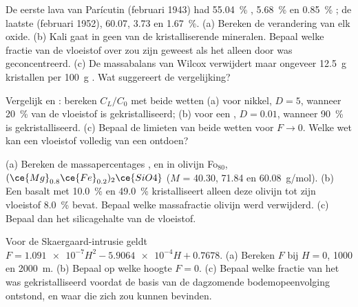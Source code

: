 \begin{exercise}[$\star$]\label{exo:b2:magmatic-differentiation:4}
De eerste lava van Parícutin (februari 1943) had \qty{55.04}{\percent} ,
\qty{5.68}{\percent}  en \qty{0.85}{\percent} ; de laatste (februari
1952), 60.07, 3.73 en \qty{1.67}{\percent}. (a) Bereken de verandering van elk oxide.
(b) Kali gaat in geen van de kristalliserende mineralen. Bepaal welke fractie van de vloeistof
over zou zijn geweest als het alleen door  was geconcentreerd.
(c) De massabalans van Wilcox verwijdert maar ongeveer \qty{12.5}{g} kristallen per
\qty{100}{g} . Wat suggereert de vergelijking?
\end{exercise}

\begin{exercise}[$\star\star$]\label{exo:b2:magmatic-differentiation:5}
Vergelijk  en : bereken $C_L/C_0$ met beide wetten
(a) voor nikkel, $D = 5$, wanneer \qty{20}{\percent} van de vloeistof is gekristalliseerd; (b)
voor een , $D = 0.01$, wanneer \qty{90}{\percent} is gekristalliseerd.
(c) Bepaal de limieten van beide wetten voor $F \to 0$. Welke wet kan een vloeistof volledig van een
 ontdoen?
\end{exercise}

\begin{exercise}[$\star\star$]\label{exo:b2:magmatic-differentiation:6}
(a) Bereken de massapercentages ,  en  in olivijn
Fo$_{80}$, $(\ce{Mg}_{0.8}\ce{Fe}_{0.2})_2\ce{SiO4}$ ($M$ = 40.30, 71.84 en
\qty{60.08}{g/mol}). (b) Een basalt met \qty{10.0}{\percent}  en
\qty{49.0}{\percent}  kristalliseert alleen deze olivijn tot zijn vloeistof
\qty{8.0}{\percent}  bevat. Bepaal welke massafractie olivijn werd verwijderd. (c) Bepaal
dan het silicagehalte van de vloeistof.
\end{exercise}

\begin{exercise}[$\star\star$]\label{exo:b2:magmatic-differentiation:7}
Voor de Skaergaard-intrusie geldt $F = \num{1.091e-7}H^2 - \num{5.9064e-4}H + 0.7678$.
(a) Bereken $F$ bij $H = 0$, 1000 en \qty{2000}{m}. (b) Bepaal op welke hoogte $F = 0$.
(c) Bepaal welke fractie van het  was gekristalliseerd voordat de basis van de dagzomende
bodemopeenvolging ontstond, en waar die zich zou kunnen bevinden.
\end{exercise}

